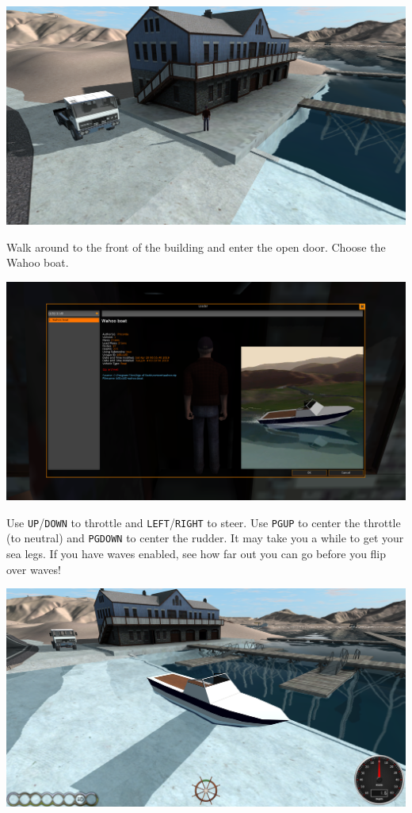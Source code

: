 \includegraphics{images/bg-boat1.png}

Walk around to the front of the building and enter the open door. Choose
the Wahoo boat.

\includegraphics{images/bg-boatselect.png}

Use \texttt{UP}/\texttt{DOWN} to throttle and
\texttt{LEFT}/\texttt{RIGHT} to steer. Use \texttt{PGUP} to center the
throttle (to neutral) and \texttt{PGDOWN} to center the rudder. It may
take you a while to get your sea legs. If you have waves enabled, see
how far out you can go before you flip over waves!

\includegraphics{images/bg-boat2.png}

